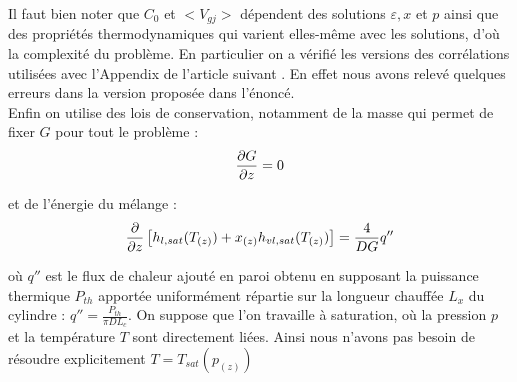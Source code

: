 Il faut bien noter que $C_0$ et $<V_{gj}>$ dépendent des solutions $\varepsilon,x$ et $p$ ainsi que des propriétés thermodynamiques qui varient elles-même avec les solutions, d'où la complexité du problème. En particulier on a vérifié les versions des corrélations utilisées avec l'Appendix de l'article suivant \cite{coddingtonStudyPerformanceVoid2002}. En effet nous avons relevé quelques erreurs dans la version proposée dans l'énoncé.\\ 

Enfin on utilise des lois de conservation, notamment de la masse qui permet de fixer $G$ pour tout le problème :
\begin{equation}
    \pder[G]{z} = 0
\end{equation}

et de l'énergie du mélange :
\begin{equation}
    \pder{z} \left[ h_{l,sat}(T_{(z)})+x_{(z)}h_{vl,sat}(T_{(z)})\right] = \frac{4}{DG}q''
\label{eq:titre}
\end{equation}

où $q''$ est le flux de chaleur ajouté en paroi obtenu en supposant la puissance thermique $P_{th}$ apportée uniformément répartie sur la longueur chauffée $L_x$ du cylindre : $q'' = \frac{P_{th}}{\pi DL_c}$. On suppose que l'on travaille à saturation, où la pression $p$ et la température $T$ sont directement liées. Ainsi nous n'avons pas besoin de résoudre explicitement $T = T_{sat}(p_{(z)})$\\ \par
